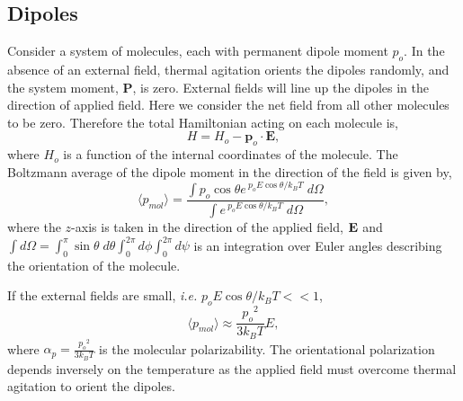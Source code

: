 \subsection{Dipoles}
\label{subsec:boltzAverage-Dipole}
Consider a system of molecules, each with permanent dipole moment
$p_o$. In the absence of an external field, thermal agitation orients
the dipoles randomly, and the system moment, $\mathbf{P}$, is zero.
External fields will line up the dipoles in the direction of applied
field.  Here we consider the net field from all other molecules to be
zero.  Therefore the total Hamiltonian acting on each molecule
is,\cite{Jackson98}
\begin{equation}
H = H_o - \mathbf{p}_o \cdot \mathbf{E},
\end{equation}
where $H_o$ is a function of the internal coordinates of the molecule.
The Boltzmann average of the dipole moment in the direction of the
field is given by,
\begin{equation}
\langle p_{mol} \rangle = \frac{\displaystyle\int p_o \cos\theta
  e^{~p_o E \cos\theta /k_B T}\; d\Omega}{\displaystyle\int  e^{~p_o E \cos\theta/k_B
    T}\; d\Omega},
\end{equation}
where the $z$-axis is taken in the direction of the applied field,
$\bf{E}$ and
$\int d\Omega = \int_0^\pi \sin\theta\; d\theta \int_0^{2\pi} d\phi
\int_0^{2\pi} d\psi$
is an integration over Euler angles describing the orientation of the
molecule.

If the external fields are small, \textit{i.e.}
$p_oE \cos\theta / k_B T << 1$,
\begin{equation}
\langle p_{mol} \rangle \approx \frac{{p_o}^2}{3 k_B T}E,
\end{equation}
where $ \alpha_p = \frac{{p_o}^2}{3 k_B T}$ is the molecular
polarizability. The orientational polarization depends inversely on
the temperature as the applied field must overcome thermal agitation
to orient the dipoles.

